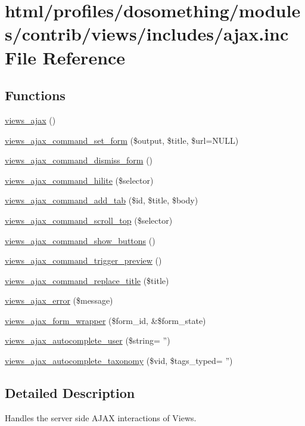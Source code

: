 \hypertarget{views_2includes_2ajax_8inc}{
\section{html/profiles/dosomething/modules/contrib/views/includes/ajax.inc File Reference}
\label{views_2includes_2ajax_8inc}
}
\subsection*{Functions}
\begin{DoxyCompactItemize}
\item 
\hyperlink{group__ajax_ga5f1adff7f07ea45d8ab62b456ffdd6e0}{views\_\-ajax} ()
\item 
\hyperlink{group__ajax_gac5062864272f5b8134072eb22a661e6f}{views\_\-ajax\_\-command\_\-set\_\-form} (\$output, \$title, \$url=NULL)
\item 
\hyperlink{group__ajax_gac0331ece9a64afe1350f116b9c5a79f1}{views\_\-ajax\_\-command\_\-dismiss\_\-form} ()
\item 
\hyperlink{group__ajax_ga22d27c9ab6b8a95f4903463eb6aabf8d}{views\_\-ajax\_\-command\_\-hilite} (\$selector)
\item 
\hyperlink{group__ajax_ga9e55776de616656e252b0f9eb8851e82}{views\_\-ajax\_\-command\_\-add\_\-tab} (\$id, \$title, \$body)
\item 
\hyperlink{group__ajax_gac7d8055fd4e9c91501496391dbe94b5a}{views\_\-ajax\_\-command\_\-scroll\_\-top} (\$selector)
\item 
\hyperlink{group__ajax_ga3ef672bfe39df163a3cf89ed23c8a0c2}{views\_\-ajax\_\-command\_\-show\_\-buttons} ()
\item 
\hyperlink{group__ajax_ga698e1518b153b16adbe61e3aeb376eac}{views\_\-ajax\_\-command\_\-trigger\_\-preview} ()
\item 
\hyperlink{group__ajax_ga42db219284fd40096900731ee6d13600}{views\_\-ajax\_\-command\_\-replace\_\-title} (\$title)
\item 
\hyperlink{group__ajax_ga59f31023b894be21852b7034f639523f}{views\_\-ajax\_\-error} (\$message)
\item 
\hyperlink{group__ajax_ga7eed0d665d7b4c8c8134eb060afbb2be}{views\_\-ajax\_\-form\_\-wrapper} (\$form\_\-id, \&\$form\_\-state)
\item 
\hyperlink{group__ajax_ga0d9404f1a04f9f5102ffac0bef92d5ab}{views\_\-ajax\_\-autocomplete\_\-user} (\$string= '')
\item 
\hyperlink{group__ajax_ga4aed960e2ee6b6e516e609188852c0f6}{views\_\-ajax\_\-autocomplete\_\-taxonomy} (\$vid, \$tags\_\-typed= '')
\end{DoxyCompactItemize}


\subsection{Detailed Description}
Handles the server side AJAX interactions of Views. 